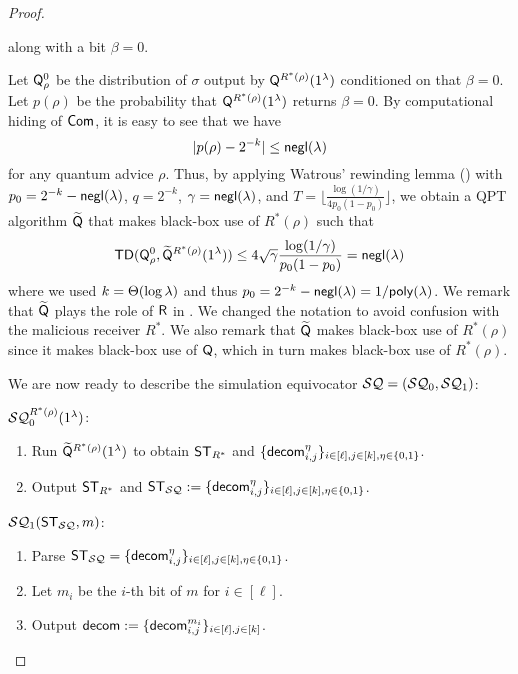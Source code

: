 \begin{proof}
\begin{enumerate}
 along with a bit $\beta=0$. 
\end{enumerate}
Let $\mathsf{Q}_\rho^{0}$ be the distribution of $\sigma$ output by $\mathsf{Q}^{R^*(\rho)}(1^\lambda)$ conditioned on that $\beta=0$. Let $p(\rho)$ be the probability that  $\mathsf{Q}^{R^*(\rho)}(1^\lambda)$ returns $\beta=0$. By  computational hiding of $\mathsf{Com}$, it is easy to see that we have 
$$
|p(\rho)-2^{-k}|\le \mathsf{negl}(\lambda)
$$
for any quantum advice $\rho$. 
Thus, by applying Watrous' rewinding lemma () with $p_0=2^{-k}-\mathsf{negl}(\lambda)$, $q=2^{-k}$, $\gamma=\mathsf{negl}(\lambda)$, and $T=\lfloor
\frac{\log (1/\gamma)}{4p_0(1-p_0)}\rfloor$, we obtain a QPT algorithm $\widetilde{\mathsf{Q}}$ that makes black-box use of $R^*(\rho)$ such that 
\begin{align} \label{eq:TD_Q_and_R}
\mathsf{TD}(\mathsf{Q}_\rho^{0},\widetilde{\mathsf{Q}}^{R^*(\rho)}(1^\lambda))\le 4\sqrt{\gamma}\frac{\log (1/\gamma)}{p_0(1-p_0)}=\mathsf{negl}(\lambda)
\end{align}
where we used $k=\Theta(\log \lambda)$ and thus $p_0=2^{-k}-\mathsf{negl}(\lambda)=1/\mathsf{poly}(\lambda)$. 
We remark that $\widetilde{\mathsf{Q}}$ plays the role of $\mathsf{R}$ in . We changed the notation to avoid confusion with the malicious receiver $R^*$. We also remark that $\widetilde{\mathsf{Q}}$ makes black-box use of $R^*(\rho)$ since it makes black-box use of $\mathsf{Q}$, which in turn makes black-box use of $R^*(\rho)$.

We are now ready to describe the simulation equivocator $\mathcal{SQ}=(\mathcal{SQ}_0,\mathcal{SQ}_1)$: 


\smallskip
\noindent
$\mathcal{SQ}_0^{R^*(\rho)}(1^\lambda)$:  
\begin{enumerate}
\item Run $\widetilde{\mathsf{Q}}^{R^*(\rho)}(1^\lambda)$ to obtain $\mathsf{ST}_{R^*}$ and $\{\mathsf{decom}_{i,j}^{\eta}\}_{i\in[\ell],j\in[k],\eta\in\{0,1\}}$.  
\item Output $\mathsf{ST}_{R^*}$ and $\mathsf{ST}_{\mathcal{SQ}}:=\{\mathsf{decom}_{i,j}^{\eta}\}_{i\in[\ell],j\in[k],\eta\in\{0,1\}}$. 
\end{enumerate}

\smallskip
\noindent
$\mathcal{SQ}_1(\mathsf{ST}_{\mathcal{SQ}},m)$:  
\begin{enumerate}
\item Parse $\mathsf{ST}_{\mathcal{SQ}}=\{\mathsf{decom}_{i,j}^{\eta}\}_{i\in[\ell],j\in[k],\eta\in\{0,1\}}$. 
\item Let $m_i$ be the $i$-th bit of $m$ for $i\in[\ell]$.  
\item Output $\mathsf{decom}:=\{\mathsf{decom}_{i,j}^{m_i}\}_{i\in[\ell],j\in[k]}$. 
\end{enumerate}


\end{proof}
